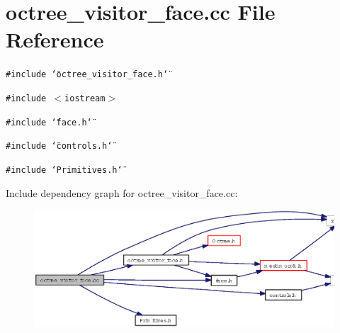 \section{octree\_\-visitor\_\-face.cc File Reference}
\label{octree__visitor__face_8cc}
{\tt \#include \char`\"{}octree\_\-visitor\_\-face.h\char`\"{}}\par
{\tt \#include $<$iostream$>$}\par
{\tt \#include \char`\"{}face.h\char`\"{}}\par
{\tt \#include \char`\"{}controls.h\char`\"{}}\par
{\tt \#include \char`\"{}Primitives.h\char`\"{}}\par


Include dependency graph for octree\_\-visitor\_\-face.cc:\begin{figure}[H]
\begin{center}
\leavevmode
\includegraphics[width=323pt]{octree__visitor__face_8cc__incl}
\end{center}
\end{figure}
